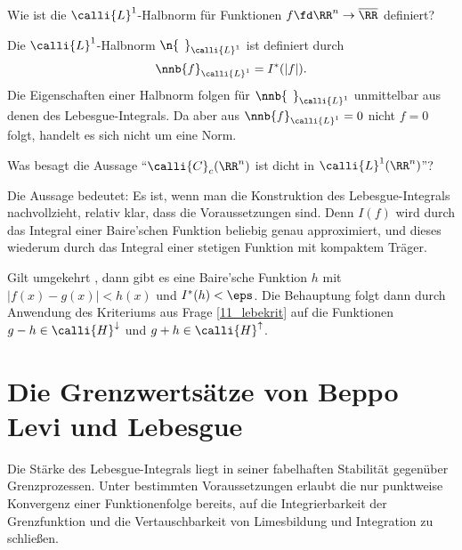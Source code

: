 \begin{frage}
  Wie ist die $\calli{L}^1$-Halbnorm für Funktionen 
  $f\fd \RR^n\to\overline{\RR}$ definiert?
\end{frage}

\begin{antwort}
  Die $\calli{L}^1$-Halbnorm $\n{\,\;}_{\calli{L}^1}$ ist 
  definiert durch
  \[
  \nnb{ f }_{\calli{L}^1} = I^*( |f| ).
  \]
  Die Eigenschaften einer Halbnorm folgen für 
  $\nnb{\;\,}_{\calli{L}^1}$ unmittelbar aus denen des Lebesgue-Integrals. 
  Da aber aus $\nnb{ f }_{\calli{L}^1}=0$ nicht $f=0$ folgt, handelt 
  es sich nicht um eine Norm. \AntEnd  
\end{antwort}

\begin{frage}
  Was besagt die Aussage "`$\calli{C}_c(\RR^n)$ ist dicht 
  in $\calli{L}^1(\RR^n)$"'?
\end{frage}

\begin{antwort}
  Die Aussage bedeutet: 
  \noindent
  Es ist, wenn man die Konstruktion des 
  Lebesgue-Integrals nachvollzieht, relativ klar, 
  dass die Voraussetzungen  sind. Denn $I(f)$ wird 
  durch das Integral einer Baire'schen Funktion beliebig genau approximiert, 
  und dieses wiederum durch das Integral einer stetigen Funktion mit kompaktem 
  Träger.  
  
  Gilt umgekehrt {\astref}, dann gibt es eine Baire'sche Funktion $h$ 
  mit $|f(x)-g(x)| < h(x)$ und $I^*( h ) < \eps$. Die Behauptung folgt 
  dann durch Anwendung des Kriteriums aus Frage \ref{11_lebekrit} auf 
  die Funktionen $g-h \in \calli{H}^\downarrow $ und 
  $g+h \in \calli{H}^\uparrow$. \AntEnd
\end{antwort}



\section{Die Grenzwerts\"atze von Beppo Levi und Lebesgue}

Die St\"arke des Lebesgue-Integrals liegt in seiner 
fabelhaften Stabilit\"at gegen\"uber Grenzprozessen. 
Unter bestimmten Voraussetzungen erlaubt die nur punktweise 
Konvergenz einer Funktionenfolge bereits, auf die 
Integrierbarkeit der Grenzfunktion und die Vertauschbarkeit von Limesbildung 
und Integration zu schließen. 

